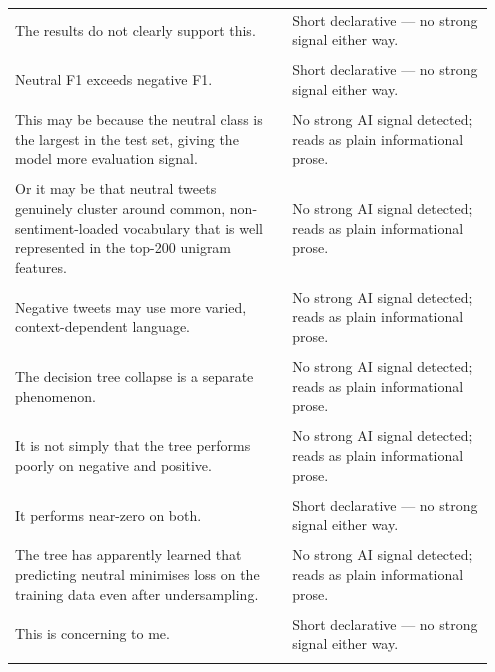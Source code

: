\documentclass[11pt]{article}
\begin{document}
\begin{longtable}{|p{0.55\linewidth}|p{0.40\linewidth}|}
\hline
\rule{0pt}{3.5cm} & \\
\hline
The results do not clearly support this. & Short declarative --- no strong signal either way. \\[2pt]
\hline
\rule{0pt}{3.5cm} & \\
\hline
Neutral F1 exceeds negative F1. & Short declarative --- no strong signal either way. \\[2pt]
\hline
\rule{0pt}{3.5cm} & \\
\hline
This may be because the neutral class is the largest in the test set, giving the model more evaluation signal. & No strong AI signal detected; reads as plain informational prose. \\[2pt]
\hline
\rule{0pt}{3.5cm} & \\
\hline
Or it may be that neutral tweets genuinely cluster around common, non-sentiment-loaded vocabulary that is well represented in the top-200 unigram features. & No strong AI signal detected; reads as plain informational prose. \\[2pt]
\hline
\rule{0pt}{3.5cm} & \\
\hline
Negative tweets may use more varied, context-dependent language. & No strong AI signal detected; reads as plain informational prose. \\[2pt]
\hline
\rule{0pt}{3.5cm} & \\
\hline
The decision tree collapse is a separate phenomenon. & No strong AI signal detected; reads as plain informational prose. \\[2pt]
\hline
\rule{0pt}{3.5cm} & \\
\hline
It is not simply that the tree performs poorly on negative and positive. & No strong AI signal detected; reads as plain informational prose. \\[2pt]
\hline
\rule{0pt}{3.5cm} & \\
\hline
It performs near-zero on both. & Short declarative --- no strong signal either way. \\[2pt]
\hline
\rule{0pt}{3.5cm} & \\
\hline
The tree has apparently learned that predicting neutral minimises loss on the training data even after undersampling. & No strong AI signal detected; reads as plain informational prose. \\[2pt]
\hline
\rule{0pt}{3.5cm} & \\
\hline
This is concerning to me. & Short declarative --- no strong signal either way. \\[2pt]
\hline
\rule{0pt}{3.5cm} & \\

\end{longtable}
\end{document}
